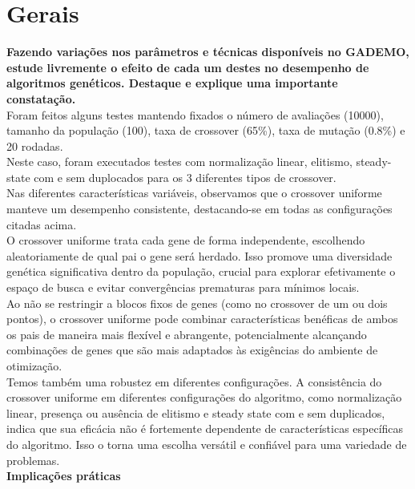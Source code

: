 \documentclass[a4paper, 12pt]{article}
\begin{document}
\newpage
\section{Gerais}
\textbf{Fazendo variações nos parâmetros e técnicas disponíveis no GADEMO, estude livremente o efeito de cada um 
destes no desempenho de algoritmos genéticos. Destaque e explique uma importante constatação.}\\

Foram feitos alguns testes mantendo fixados o número de avaliações (10000), tamanho da população (100), taxa de crossover (65\%), taxa de mutação (0.8\%) e 20 rodadas. \\

Neste caso, foram executados testes com normalização linear, elitismo, steady-state com e sem duplocados para os 3 diferentes tipos de crossover. \\

Nas diferentes características variáveis, observamos que o crossover uniforme manteve um desempenho consistente, destacando-se em todas as configurações citadas acima.\\


O crossover uniforme trata cada gene de forma independente, escolhendo aleatoriamente de qual pai o gene será herdado. Isso promove uma diversidade genética significativa dentro da população, crucial para explorar efetivamente o espaço de busca e evitar convergências prematuras para mínimos locais.\\ 
Ao não se restringir a blocos fixos de genes (como no crossover de um ou dois pontos), o crossover uniforme pode combinar características benéficas de ambos os pais de maneira mais flexível e abrangente, potencialmente alcançando combinações de genes que são mais adaptados às exigências do ambiente de otimização.\\
Temos também uma robustez em diferentes configurações. A consistência do crossover uniforme em diferentes configurações do algoritmo, como normalização linear, presença ou ausência de elitismo e steady state com e sem duplicados, indica que sua eficácia não é fortemente dependente de características específicas do algoritmo. Isso o torna uma escolha versátil e confiável para uma variedade de problemas.\\

\textbf{Implicações práticas} \\
\end{document}

